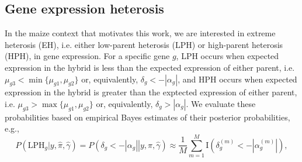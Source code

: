 \documentclass[useAMS,usenatbib,referee]{biom}
\begin{document}
\subsection{Gene expression heterosis}
\label{s:gene_heterosis}

In the maize context that motivates this work, we are interested in extreme heterosis (EH), i.e. either low-parent heterosis (LPH) or high-parent heterosis (HPH), in gene expression. 
For a specific gene $g$, LPH occurs when expected expression in the hybrid is less than the expected expression of either parent, i.e. $\mu_{g3} < \min\{\mu_{g1},\mu_{g2}\}$ or, equivalently, $\delta_g < -|\alpha_g|$, and HPH occurs when expected expression in the hybrid is greater than the exptected expression of either parent, i.e. $\mu_{g3} > \max\{\mu_{g1},\mu_{g2}\}$ or, equivalently, $\delta_g > |\alpha_g|$. 
We evaluate these probabilities based on empirical Bayes estimates of their posterior probabilities, e.g., 
\begin{equation}
P(\mbox{LPH}_g|y,\hat{\pi},\hat{\gamma}) = 
P\left(\left.\delta_g < -|\alpha_g|\right|y, \hat{\pi},\hat{\gamma}\right) \approx \frac{1}{M} \sum_{m=1}^M \mathrm{I}\left(\delta_g^{(m)} < -\left|\alpha_g^{(m)}\right|\right), 
\label{e:probs}
\end{equation}
\end{document}
